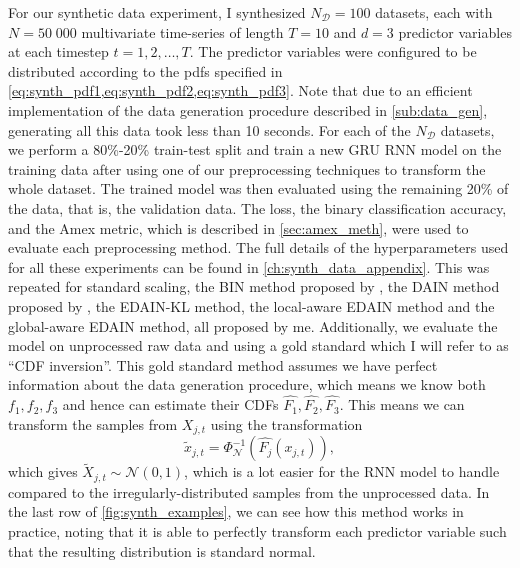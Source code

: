 \documentclass{statsmsc}
\begin{document}
{%
For our synthetic data experiment, I synthesized $N_\mathcal{D}=100$ datasets, each with
$N=50\;000$ multivariate time-series of length $T=10$ and  $d=3$ predictor variables at each
timestep $t=1,2,\dots,T$. The predictor variables were configured to be distributed according to
the \acp{pdf} specified in \cref{eq:synth_pdf1,eq:synth_pdf2,eq:synth_pdf3}. Note that due to
an efficient implementation of the data generation procedure described in
\cref{sub:data_gen}, generating all this data took less than 10 seconds.
For each of the $N_{\mathcal{D}}$ datasets, we perform a 80\%-20\% train-test split and train
a new \ac{GRU} \ac{RNN} model on the training data after
using one of our preprocessing techniques to transform the whole dataset. The trained model
was then evaluated using the remaining 20\% of the data, that is, the validation data.
The loss, the binary classification accuracy, and the Amex metric, which is described
in \cref{sec:amex_meth}, were used to evaluate each preprocessing method.
The full details of the hyperparameters used for all these experiments can be found in
\cref{ch:synth_data_appendix}. This was repeated for standard scaling, the \ac{BIN} method
proposed by \cite{bin}, the \ac{DAIN} method proposed by \cite{dain}, the \ac{EDAIN-KL} method,
the local-aware \ac{EDAIN} method and the global-aware \ac{EDAIN} method, all proposed by me.
Additionally, we evaluate the model on unprocessed raw data and using a gold standard which I will
refer to as ``\ac{CDF} inversion''. This gold standard method assumes we have perfect information about the
data generation procedure, which means we know both $f_1,f_2,f_3$ and hence can
estimate their \acp{CDF} $\widehat{F_1},\widehat{F_2},\widehat{F_3}$.
This means we can transform the samples from $X_{j,t}$ using the transformation
\begin{equation}
    \tilde{x}_{j,t}=\Phi_{\mathcal{N}}^{-1}\left(\widehat{F_j}(x_{j,t})\right),
\end{equation}
which gives $\tilde{X}_{j,t} \sim \mathcal{N}(0,1)$, which is a lot easier for the \ac{RNN} model
to handle compared to the irregularly-distributed samples from the unprocessed data.
In the last row of \cref{fig:synth_examples}, we can see how this method works in practice,
noting that it is able to perfectly transform each predictor variable such that the resulting
distribution is standard normal.

}
\end{document}
